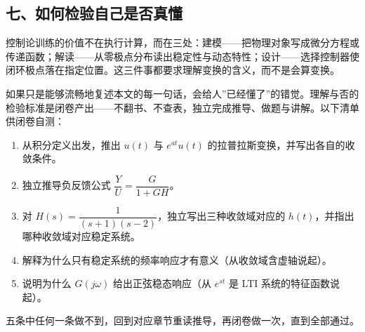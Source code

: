 \documentclass[12pt]{ctexart}
\providecommand{\tightlist}{\setlength{\itemsep}{0pt}\setlength{\parskip}{0pt}}
\begin{document}
\hypertarget{ux4e03ux5982ux4f55ux68c0ux9a8cux81eaux5df1ux662fux5426ux771fux61c2}{%
\subsection{七、如何检验自己是否真懂}\label{ux4e03ux5982ux4f55ux68c0ux9a8cux81eaux5df1ux662fux5426ux771fux61c2}}

控制论训练的价值不在执行计算，而在三处：建模------把物理对象写成微分方程或传递函数；解读------从零极点分布读出稳定性与动态特性；设计------选择控制器使闭环极点落在指定位置。这三件事都要求理解变换的含义，而不是会算变换。

如果只是能够流畅地复述本文的每一句话，会给人''已经懂了''的错觉。理解与否的检验标准是闭卷产出------不翻书、不查表，独立完成推导、做题与讲解。以下清单供闭卷自测：

\begin{enumerate}
\def\labelenumi{\arabic{enumi}.}
\tightlist
\item
  从积分定义出发，推出 \(u(t)\) 与 \(e^{at}u(t)\)
  的拉普拉斯变换，并写出各自的收敛条件。
\item
  独立推导负反馈公式 \(\dfrac{Y}{U}=\dfrac{G}{1+GH}\)。
\item
  对 \(H(s)=\dfrac{1}{(s+1)(s-2)}\)，独立写出三种收敛域对应的
  \(h(t)\)，并指出哪种收敛域对应稳定系统。
\item
  解释为什么只有稳定系统的频率响应才有意义（从收敛域含虚轴说起）。
\item
  说明为什么 \(G(j\omega)\) 给出正弦稳态响应（从 \(e^{st}\) 是 LTI
  系统的特征函数说起）。
\end{enumerate}

五条中任何一条做不到，回到对应章节重读推导，再闭卷做一次，直到全部通过。
\end{document}
